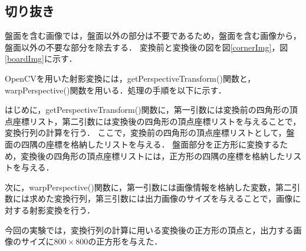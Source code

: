 \documentclass[openright]{nitocs}
\numberwithin{equation}{section}
\begin{document}
        \subsection{切り抜き}
        \label{boardCut}
            盤面を含む画像では，盤面以外の部分は不要であるため，盤面を含む画像から，盤面以外の不要な部分を除去する．
            変換前と変換後の図を図\ref{cornerImg}，図\ref{boardImg}に示す．

            OpenCVを用いた射影変換には，getPerspectiveTransform()関数と，warpPerspective()関数を用いる．処理の手順を以下に示す．

            はじめに，getPerspectiveTransform()関数に，第一引数には変換前の四角形の頂点座標リスト，第二引数には変換後の四角形の頂点座標リストを与えることで，変換行列の計算を行う．
            ここで，変換前の四角形の頂点座標リストとして，盤面の四隅の座標を格納したリストを与える．
            盤面部分を正方形に変換するため，変換後の四角形の頂点座標リストには，正方形の四隅の座標を格納したリストを与える．

            次に，warpPerspective()関数に，第一引数には画像情報を格納した変数，第二引数には求めた変換行列，第三引数には出力画像のサイズを与えることで，画像に対する射影変換を行う．

            今回の実験では，変換行列の計算に用いる変換後の正方形の頂点と，出力する画像のサイズに$800\times800$の正方形を与えた．
\end{document}
